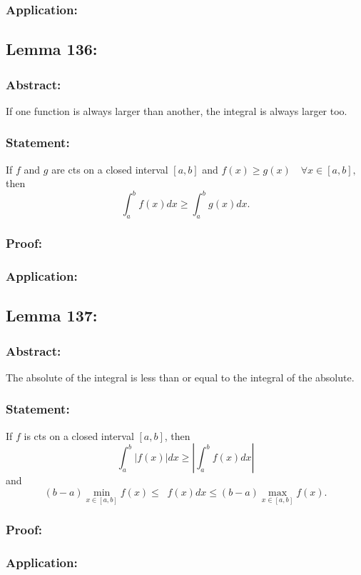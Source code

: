 \documentclass{article}
\DeclareMathOperator\inti{\int_{a}^{b}}
\begin{document}
\subsubsection*{Application:}

\subsection{Lemma 136:}
\subsubsection*{Abstract:}
If one function is always larger than another, the integral is always larger too.
\subsubsection*{Statement:}
If $f$ and $g$ are cts on a closed interval $[a,b]$ and $f(x) \geq g(x) \quad \forall x \in [a,b],$
then $$
\int_{a}^{b}f(x)dx \geq \int_{a}^{b}g(x)dx.
$$
\subsubsection*{Proof:}

\subsubsection*{Application:}

\subsection{Lemma 137:}
\subsubsection*{Abstract:}
The absolute of the integral is less than or equal to the integral of the absolute.
\subsubsection*{Statement:}
If $f$ is cts on a closed interval $[a,b]$, then $$
\int_{a}^{b}|f(x)|dx \geq \left| \int_{a}^{b}f(x)dx \right|
$$
and
$$
(b-a)\min_{x \in [a,b]}f(x) \leq \inti f(x)dx \leq (b-a)\max_{x \in [a,b]}f(x).
$$
\subsubsection*{Proof:}

\subsubsection*{Application:}
\end{document}
